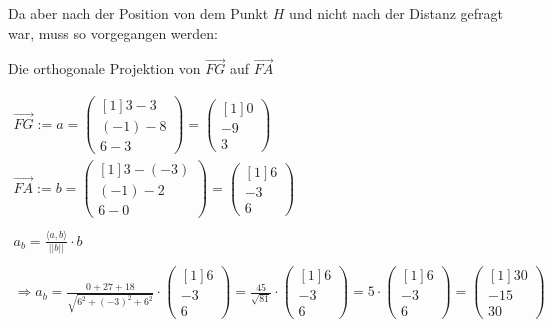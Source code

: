 \documentclass[main.tex]{subfiles}
\begin{document}
Da aber nach der Position von dem Punkt $H$ und nicht nach der Distanz gefragt war, muss so vorgegangen werden:

Die orthogonale Projektion von $\vec{FG}$ auf $\vec{FA}$

\begin{gather*}
    \overrightarrow{FG} :=a=\begin{pmatrix}[1]
    3-3\\
    ( -1) -8\\
    6-3
    \end{pmatrix} =\begin{pmatrix}[1]
    0\\
    -9\\
    3
    \end{pmatrix}\\
    \overrightarrow{FA} :=b=\begin{pmatrix}[1]
    3-( -3)\\
    ( -1) -2\\
    6-0
    \end{pmatrix} =\begin{pmatrix}[1]
    6\\
    -3\\
    6
    \end{pmatrix}\\
    \\
    a_{b} =\frac{\langle a,b\rangle }{|| b| |} \cdotp b\\
    \\
    \Rightarrow a_{b} =\frac{0+27+18}{\sqrt{6^{2} +( -3)^{2} +6^{2}}} \cdotp \begin{pmatrix}[1]
    6\\
    -3\\
    6
    \end{pmatrix} =\frac{45}{\sqrt{81}} \cdotp \begin{pmatrix}[1]
    6\\
    -3\\
    6
    \end{pmatrix} =5\cdotp \begin{pmatrix}[1]
    6\\
    -3\\
    6
    \end{pmatrix} =\begin{pmatrix}[1]
    30\\
    -15\\
    30
    \end{pmatrix}
\end{gather*}    
\end{document}
